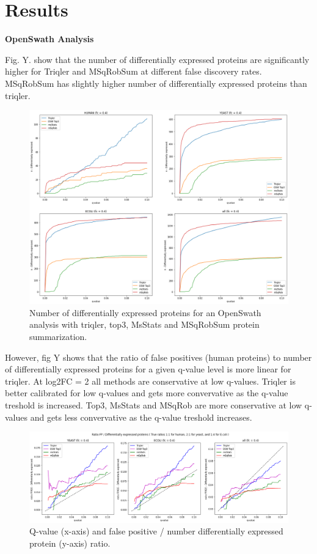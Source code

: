 \documentclass[10pt,letterpaper]{article}
\begin{document}
\section*{Results}


\textbf{OpenSwath Analysis}

Fig. Y. show that the number of differentially expressed proteins are significantly higher for Triqler and MSqRobSum at different false discovery rates. MSqRobSum has slightly higher number of differentially expressed proteins than triqler. 

\begin{figure}[H]
    \centering
    \includegraphics[width=12cm]{../../result/2021-08-13_docs_plots/n_diff_expressed.png}
    \caption{Number of differentially expressed proteins for an OpenSwath analysis with triqler, top3, MsStats and MSqRobSum protein summarization.}
    \label{fig:osw_n_diff_exp}
\end{figure}


However, fig Y shows that the ratio of false positives (human proteins) to number of differentially expressed proteins for a given q-value level is more linear for triqler. At log2FC = 2 all methods are conservative at low q-values. Triqler is better calibrated for low q-values and gets more convervative as the q-value treshold is increased. Top3, MsStats and MSqRob are more conservative at low q-values and gets less convervative as the q-value treshold increases.  

   
\begin{figure}[H]
    \centering
    \includegraphics[width=12cm]{../../result/2021-08-13_docs_plots/calibration_plot.png}
    \caption{Q-value (x-axis) and false positive / number differentially expressed protein (y-axis) ratio.}
    \label{fig:osw_n_diff_exp}
\end{figure}
\end{document}
